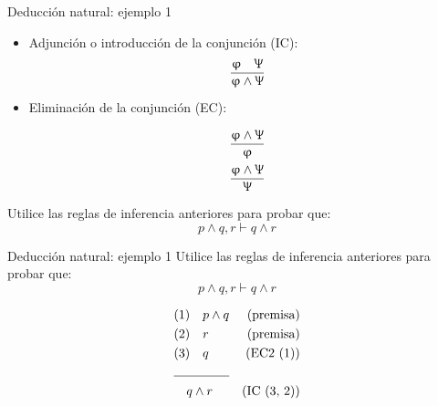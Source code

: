 \documentclass{beamer}
\begin{document}
\begin{frame}{Deducción natural: ejemplo 1}
  \begin{itemize}
    \item Adjunción o introducción de la conjunción (IC):
    $$\dfrac{\upvarphi \quad \Uppsi}{\upvarphi \land \Uppsi}$$

    \item Eliminación de la conjunción (EC):
          \begin{multicols}{2}
            \noindent
            \begin{equation}
              \dfrac{\upvarphi \land \Uppsi}{\upvarphi}
            \end{equation}
            \begin{equation}
              \dfrac{\upvarphi \land \Uppsi}{\Uppsi}
            \end{equation}
          \end{multicols}
  \end{itemize}

  Utilice las reglas de inferencia anteriores para probar que:
  $$p \land q, r \vdash q\land r$$
\end{frame}


\begin{frame}{Deducción natural: ejemplo 1}
  Utilice las reglas de inferencia anteriores para probar que:
  $$p \land q, r \vdash q\land r$$

  \begin{align*}
    &(1) \quad p \land q &\text{(premisa)}\\
    &(2) \quad r &\text{(premisa)}\\
    &(3) \quad q &\text{(EC2 (1))}\\
    \cline{1-2}
    &\quad q \land r &\text{(IC (3, 2))}
  \end{align*}
\end{frame}
\end{document}
